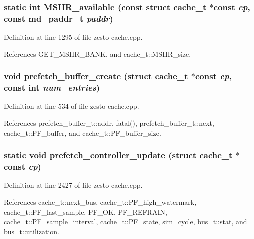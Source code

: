 \subsubsection[{MSHR\_\-available}]{\setlength{\rightskip}{0pt plus 5cm}static int MSHR\_\-available (const struct {\bf cache\_\-t} $\ast$const  {\em cp}, \/  const {\bf md\_\-paddr\_\-t} {\em paddr})\hspace{0.3cm}{\tt  [inline, static]}}\label{zesto-cache_8cpp_eb1b85c3ab5d1ac1520577d21fd09dee}




Definition at line 1295 of file zesto-cache.cpp.

References GET\_\-MSHR\_\-BANK, and cache\_\-t::MSHR\_\-size.
\subsubsection[{prefetch\_\-buffer\_\-create}]{\setlength{\rightskip}{0pt plus 5cm}void prefetch\_\-buffer\_\-create (struct {\bf cache\_\-t} $\ast$const  {\em cp}, \/  const int {\em num\_\-entries})}\label{zesto-cache_8cpp_16dacff1f1e08b2a7fe82d35f3733f91}




Definition at line 534 of file zesto-cache.cpp.

References prefetch\_\-buffer\_\-t::addr, fatal(), prefetch\_\-buffer\_\-t::next, cache\_\-t::PF\_\-buffer, and cache\_\-t::PF\_\-buffer\_\-size.
\subsubsection[{prefetch\_\-controller\_\-update}]{\setlength{\rightskip}{0pt plus 5cm}static void prefetch\_\-controller\_\-update (struct {\bf cache\_\-t} $\ast$const  {\em cp})\hspace{0.3cm}{\tt  [static]}}\label{zesto-cache_8cpp_563b4fe087e7d8225f1e3aea2f1e8235}




Definition at line 2427 of file zesto-cache.cpp.

References cache\_\-t::next\_\-bus, cache\_\-t::PF\_\-high\_\-watermark, cache\_\-t::PF\_\-last\_\-sample, PF\_\-OK, PF\_\-REFRAIN, cache\_\-t::PF\_\-sample\_\-interval, cache\_\-t::PF\_\-state, sim\_\-cycle, bus\_\-t::stat, and bus\_\-t::utilization.
